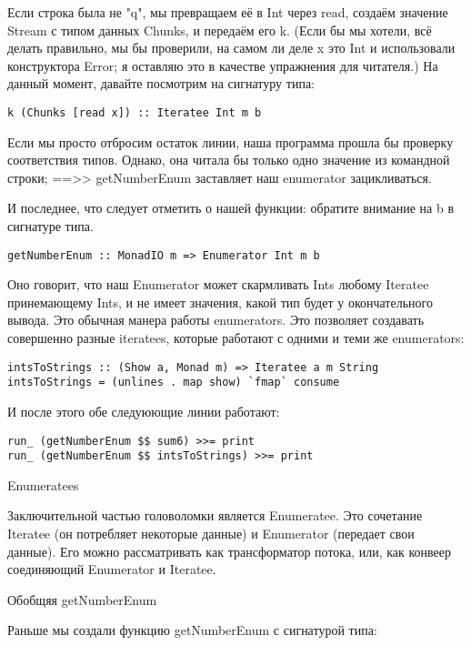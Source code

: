 Если строка была не "q", мы превращаем её в Int через read, создаём значение Stream с типом данных Chunks, и передаём его k. (Если бы мы хотели, всё делать правильно, мы бы проверили, на самом ли деле x это Int и использовали конструктора Error; я оставляю это в качестве упражнения для читателя.) На данный момент, давайте посмотрим на сигнатуру типа:

\begin{lstlisting}
k (Chunks [read x]) :: Iteratee Int m b
\end{lstlisting}

Если мы просто отбросим остаток линии, наша программа прошла бы проверку соответствия типов. Однако, она читала бы только одно значение из командной строки; ==>> getNumberEnum заставляет наш enumerator зацикливаться.

И последнее, что следует отметить о нашей функции: обратите внимание на b в сигнатуре типа.

\begin{lstlisting}
getNumberEnum :: MonadIO m => Enumerator Int m b
\end{lstlisting}

Оно говорит, что наш Enumerator может скармливать Ints любому Iteratee принемающему Ints, и не имеет значения, какой тип будет у окончательного вывода. Это обычная манера работы enumerators. Это позволяет создавать совершенно разные iteratees, которые работают с одними и теми же enumerators:

\begin{lstlisting}
intsToStrings :: (Show a, Monad m) => Iteratee a m String
intsToStrings = (unlines . map show) `fmap` consume
\end{lstlisting}

И после этого обе следуюющие линии работают:

\begin{lstlisting}
run_ (getNumberEnum $$ sum6) >>= print
run_ (getNumberEnum $$ intsToStrings) >>= print
\end{lstlisting}

Enumeratees

Заключительной частью головоломки является Enumeratee. Это сочетание Iteratee (он потребляет некоторые данные) и Enumerator (передает свои данные). Его можно рассматривать как трансформатор потока, или, как конвеер соединяющий Enumerator и Iteratee.

Обобщяя getNumberEnum

Раньше мы создали функцию getNumberEnum с сигнатурой типа:

